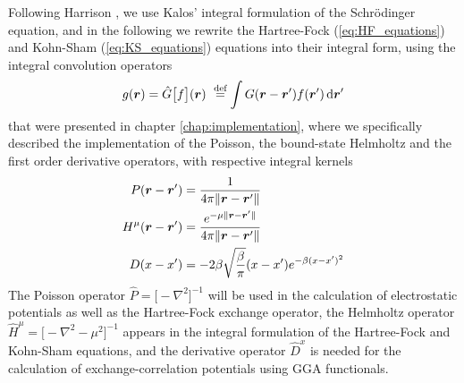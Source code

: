 Following Harrison \etal\cite{Harrison_basic:2004}, we use Kalos'\cite{Kalos:1962} integral 
formulation of the 
Schr\"{o}dinger equation, and in the following we rewrite the Hartree-Fock (\ref{eq:HF_equations}) 
and Kohn-Sham (\ref{eq:KS_equations}) equations into their integral form, using the integral 
convolution operators
\begin{equation}
    g(\bs{r}) = \hat{G}\big[f\big](\bs{r}) \mydef \int G(\bs{r}-\bs{r}') f(\bs{r}') \ud\bs{r}'
\end{equation}
that were presented in chapter \ref{chap:implementation}, where we specifically described
the implementation of the Poisson, the bound-state Helmholtz and the first order derivative 
operators, with respective integral kernels
\begin{align}
    P(\boldsymbol r-\boldsymbol r') &= \frac{1}{4\pi\|\boldsymbol r-\boldsymbol r'\|}\\
    H^\mu(\boldsymbol r-\boldsymbol r') &= \frac{e^{-\mu\|\boldsymbol r-\boldsymbol r'\|}}{4\pi\|\boldsymbol r-\boldsymbol r'\|}\\
    D(x-x') &= -2\beta \sqrt{\frac{\beta}{\pi}}(x-x')e^{-\beta (x-x')^2}
\end{align}
The Poisson operator $\hat{P}=\big[-\nabla^2\big]^{-1}$ will be used in the calculation of 
electrostatic potentials as well as the Hartree-Fock exchange operator, the Helmholtz 
operator $\hat{H}^\mu=\big[-\nabla^2-\mu^2\big]^{-1}$ appears in the integral formulation 
of the Hartree-Fock and Kohn-Sham equations, and the derivative operator $\hat{D}^x$ is 
needed for the calculation of exchange-correlation potentials using GGA functionals.

